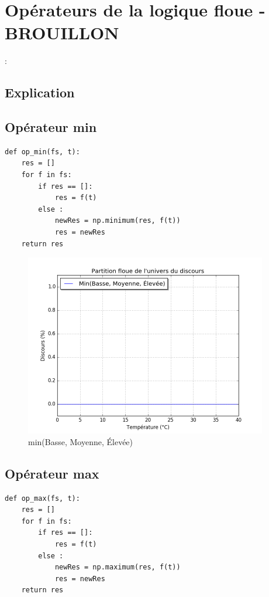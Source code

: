 \documentclass[a4paper]{article}
\begin{document}
\clearpage

\section{Opérateurs de la logique floue -BROUILLON}:

\subsection{Explication}

\subsection{Opérateur min}
\begin{lstlisting}
def op_min(fs, t):
    res = []
    for f in fs:
        if res == []:
            res = f(t)
        else :
            newRes = np.minimum(res, f(t))
            res = newRes
    return res
\end{lstlisting}

\begin{figure}[h]
\begin{center}
	\includegraphics[width=400px]{plot_test_min.png}
\end{center}
\caption{min(Basse, Moyenne, Élevée)}
\end{figure}

\subsection{Opérateur max}
\begin{lstlisting}
def op_max(fs, t):
    res = []
    for f in fs:
        if res == []:
            res = f(t)
        else :
            newRes = np.maximum(res, f(t))
            res = newRes
    return res
\end{lstlisting}
\end{document}
